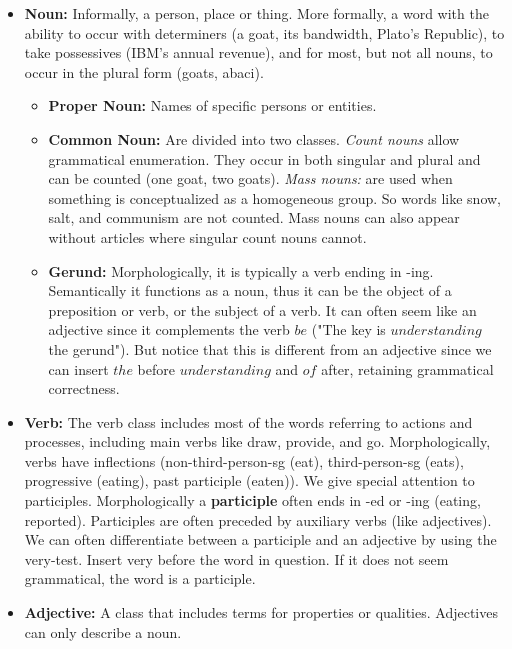 \documentclass[11pt]{article}
\begin{document}
	\begin{itemize}
		\item \textbf{Noun:} Informally, a person, place or thing. More formally, a word with the ability to occur with 
		determiners (a goat, its bandwidth, Plato's Republic), to take possessives (IBM's annual revenue), and for 
		most, but not all nouns, to occur in the plural form (goats, abaci). 
			\begin{itemize}
				\item \textbf{Proper Noun:} Names of specific persons or entities. 
				\item \textbf{Common Noun:} Are divided into two classes. \textit{Count nouns} allow grammatical
					enumeration. They occur in both singular and plural and can be counted (one goat, two goats). 
					\textit{Mass nouns:} are used when something is conceptualized as a homogeneous 
					group. So words like snow, salt, and communism are not counted. Mass nouns can also appear 
					without articles where singular count nouns cannot. 
				\item \textbf{Gerund:} Morphologically, it is typically a verb ending in -ing. Semantically it functions as a 
					noun, thus it can be the object of a preposition or verb, or the subject of a verb.	It can often seem 
					like an adjective since it complements the verb $be$ ("The key is $understanding$ the gerund"). But
					notice that this is different from an adjective since we can insert $the$ before $understanding$ and $of$
					after, retaining grammatical correctness.  					
			\end{itemize}
			
		\item \textbf{Verb:} The verb class includes most of the words referring to actions and processes, including main verbs
			like draw, provide, and go. Morphologically, verbs have inflections (non-third-person-sg (eat), third-person-sg
			(eats), progressive (eating), past participle (eaten)). We give special attention to participles. Morphologically a 
			\textbf{participle} often ends in -ed or -ing (eating, reported). Participles are often preceded by auxiliary verbs
			(like adjectives). We can often differentiate between a participle and an adjective by using the very-test. Insert
			very before the word in question. If it does not seem grammatical, the word is a participle. 
			
		\item \textbf{Adjective: } A class that includes terms for properties or qualities. Adjectives can only describe a noun.
		

\end{itemize}
\end{document}
